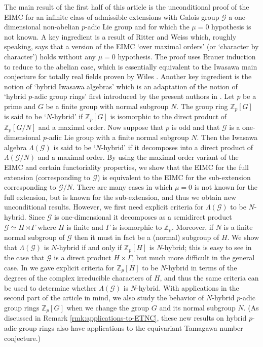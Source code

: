 \documentclass[12pt]{amsart}
\theoremstyle{plain}
\theoremstyle{remark}
\theoremstyle{definition}
\numberwithin{equation}{section}
\begin{document}
The main result of the first half of this article is the unconditional proof of the EIMC for an infinite class of admissible extensions with Galois group $\mathcal{G}$
a one-dimensional non-abelian $p$-adic Lie group and for which the $\mu=0$ hypothesis is not known.
A key ingredient is a result of Ritter and Weiss \cite{MR2114937} which, roughly speaking,
says that a version of the EIMC `over maximal orders' (or `character by character') holds without any $\mu=0$ hypothesis.
The proof uses Brauer induction to reduce to the abelian case, which is essentially equivalent to
the Iwasawa main conjecture for totally real fields proven by Wiles \cite{MR1053488}. 
Another key ingredient is the notion of `hybrid Iwasawa algebras' which is an adaptation of 
the notion of `hybrid $p$-adic group rings' first introduced by the present authors in \cite{hybrid-ETNC}.
Let $p$ be a prime and $G$ be a finite group with normal subgroup $N$.
The group ring ${\mathbb{Z}}_{p}[G]$ is said to be `$N$-hybrid' if ${\mathbb{Z}}_{p}[G]$ is isomorphic to the direct product of ${\mathbb{Z}}_{p}[G/N]$ and a maximal order.
Now suppose that $p$ is odd and that $\mathcal{G}$ is a one-dimensional $p$-adic Lie group with a finite normal subgroup $N$.
Then the Iwasawa algebra $\Lambda(\mathcal{G})$ is said to be `$N$-hybrid' 
if it decomposes into a direct product of $\Lambda(\mathcal{G}/N)$ and a maximal order.
By using the maximal order variant of the EIMC and certain functoriality properties, we show that the EIMC for the 
full extension (corresponding to $\mathcal{G}$) is equivalent to the EIMC for the sub-extension corresponding to $\mathcal{G}/N$.
There are many cases in which $\mu=0$ is not known for the full extension, but is known for the sub-extension,
and thus we obtain new unconditional results. 
However, we first need explicit criteria for $\Lambda(\mathcal{G})$ to be $N$-hybrid.
Since $\mathcal{G}$ is one-dimensional it decomposes as a semidirect product $\mathcal{G} \simeq H \rtimes \Gamma$
where $H$ is finite and $\Gamma$ is isomorphic to ${\mathbb{Z}}_{p}$. 
Moreover, if $N$ is a finite normal subgroup of $\mathcal{G}$ then it must in fact be a (normal) subgroup of $H$.
We show that $\Lambda(\mathcal{G})$ is $N$-hybrid if and only if ${\mathbb{Z}}_{p}[H]$ is $N$-hybrid;
this is easy to see in the case that $\mathcal{G}$ is a direct product $H \times \Gamma$, 
but much more difficult in the general case. 
In \cite{hybrid-ETNC} we gave explicit criteria for ${\mathbb{Z}}_{p}[H]$ to be $N$-hybrid in terms of the degrees of the complex irreducible characters of $H$,
and thus the same criteria can be used to determine whether $\Lambda(\mathcal{G})$ is $N$-hybrid. 
With applications in the second part of the article in mind, we also study the behavior of $N$-hybrid
$p$-adic group rings ${\mathbb{Z}}_{p}[G]$ when we change the group $G$ and its normal subgroup $N$.
(As discussed in Remark \ref{rmk:applications-to-ETNC}, these new results on hybrid $p$-adic group rings also have applications 
to the equivariant Tamagawa number conjecture.)
\\ 
\end{document}
